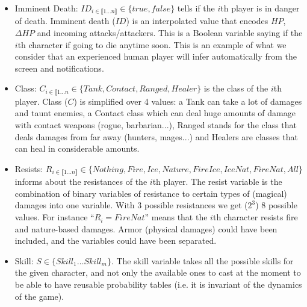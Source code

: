 \begin{itemize}
    \item Imminent Death: $ID_{i \in \llbracket 1 \dots n \rrbracket} \in \{true, false\}$ tells if the $i$th player is in danger of death. Imminent death ($ID$) is an interpolated value that encodes $HP$, $\Delta HP$ and incoming attacks/attackers. %
This is a Boolean variable saying if the $i$th character if going to die anytime soon. This is an example of what we consider that an experienced human player will infer automatically from the screen and notifications. 
    \item Class: $C_{i \in \llbracket 1 \dots n} \in \{Tank, Contact, Ranged, Healer\}$ is the class of the $i$th player. Class ($C$) is simplified over 4 values: a Tank can take a lot of damages and taunt enemies, a Contact class which can deal huge amounts of damage with contact weapons (rogue, barbarian...), Ranged stands for the class that deals damages from far away (hunters, mages...) and Healers are classes that can heal in considerable amounts. 
    \item Resists: $R_{i \in \llbracket 1 \dots n \rrbracket} \in \{Nothing, Fire, Ice, Nature, FireIce, IceNat, FireNat, All\}$ informs about the resistances of the $i$th player. The resist variable is the combination of binary variables of resistance to certain types of (magical) damages into one variable. With 3 possible resistances we get ($2^3$) 8 possible values. For instance ``$R_i=FireNat$'' means that the $i$th character resists fire and nature-based damages. Armor (physical damages) could have been included, and the variables could have been separated. 
    \item Skill: $S \in \{Skill_1 \dots Skill_m\}$. The skill variable takes all the possible skills for the given character, and not only the available ones to cast at the moment to be able to have reusable probability tables (i.e. it is invariant of the dynamics of the game).
\end{itemize}


